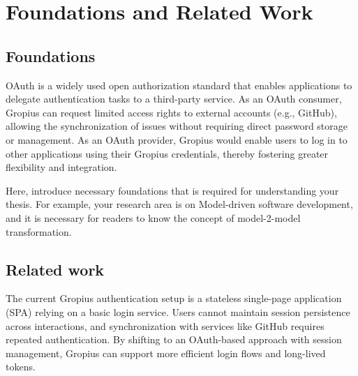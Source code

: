 
\chapter{Foundations and Related Work}
\label{chap:foundation}




\section{Foundations}

OAuth is a widely used open authorization standard that enables applications to delegate authentication tasks to a third-party service.
As an OAuth consumer, Gropius can request limited access rights to external accounts (e.g., GitHub),
allowing the synchronization of issues without requiring direct password storage or management.
As an OAuth provider, Gropius would enable users to log in to other applications using their Gropius credentials,
thereby fostering greater flexibility and integration.

Here, introduce necessary foundations that is required for understanding your thesis. For example, your research area is on Model-driven software development, and it is necessary for readers to know the concept of model-2-model transformation.
\section{Related work}
The current Gropius authentication setup is a stateless single-page application (SPA) relying on a basic login service.
Users cannot maintain session persistence across interactions, and synchronization with services like GitHub requires repeated authentication.
By shifting to an OAuth-based approach with session management, Gropius can support more efficient login flows and long-lived tokens.

